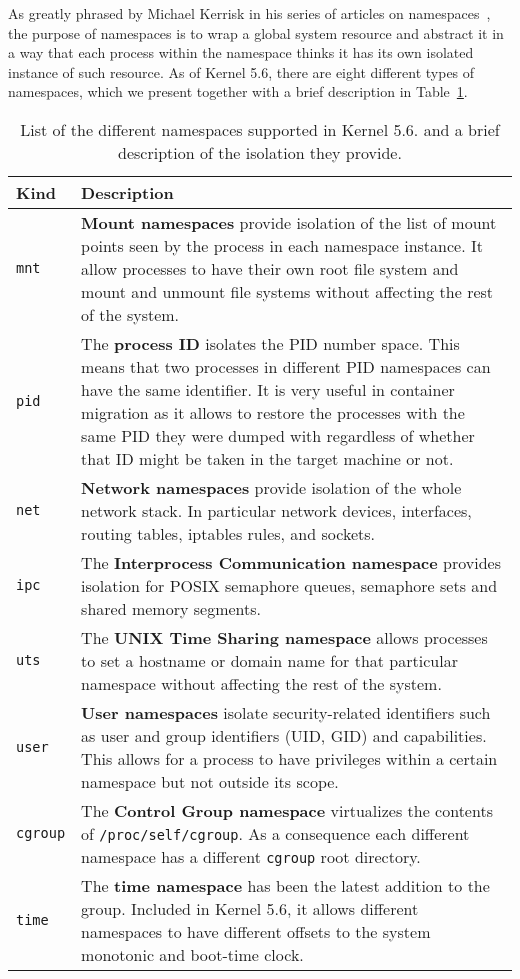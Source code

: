 As greatly phrased by Michael Kerrisk in his series of articles on namespaces~\cite{Kerrisk2013}, the purpose of namespaces is to wrap a global system resource and abstract it in a way that each process within the namespace thinks it has its own isolated instance of such resource.
As of Kernel 5.6, there are eight different types of namespaces, which we present together with a brief description in Table~\ref{table:namespaces}.
\begin{table}[h!]
    \centering
    \begin{tabular}{p{2cm}p{13cm}}
        \hline
        \textbf{Kind} & \textbf{Description} \\[3pt]
        \hline \hline
        \texttt{mnt} & \textbf{Mount namespaces} provide isolation of the list of mount points seen by the process in each namespace instance. It allow processes to have their own root file system and mount and unmount file systems without affecting the rest of the system. \\[3pt]
        \texttt{pid} & The \textbf{process ID} isolates the PID number space. This means that two processes in different PID namespaces can have the same identifier. It is very useful in container migration as it allows to restore the processes with the same PID they were dumped with regardless of whether that ID might be taken in the target machine or not. \\[3pt]
        \texttt{net} & \textbf{Network namespaces} provide isolation of the whole network stack. In particular network devices, interfaces, routing tables, iptables rules, and sockets. \\[3pt]
        \texttt{ipc} & The \textbf{Interprocess Communication namespace} provides isolation for POSIX semaphore queues, semaphore sets and shared memory segments.\\[3pt]
        \texttt{uts} & The \textbf{UNIX Time Sharing namespace} allows processes to set a hostname or domain name for that particular namespace without affecting the rest of the system. \\[3pt]
        \texttt{user} & \textbf{User namespaces} isolate security-related identifiers such as user and group identifiers (UID, GID) and capabilities. This allows for a process to have privileges within a certain namespace but not outside its scope. \\[3pt]
        \texttt{cgroup} & The \textbf{Control Group namespace} virtualizes the contents of \texttt{/proc/self/cgroup}. As a consequence each different namespace has a different \texttt{cgroup} root directory.\\[3pt]
        \texttt{time} & The \textbf{time namespace} has been the latest addition to the group. Included in Kernel 5.6, it allows different namespaces to have different offsets to the system monotonic and boot-time clock.\\[3pt]
        \hline
    \end{tabular}
    \caption[List of the different namespaces supported in Kernel 5.6.]{List of the different namespaces supported in Kernel 5.6. and a brief description of the isolation they provide.\label{table:namespaces}}
\end{table}
